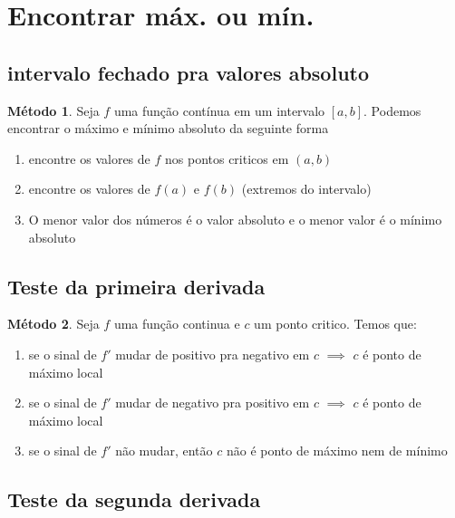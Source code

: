 \documentclass[14pt]{extreport}
\theoremstyle{definition}
\newtheorem{method}{Método}
\begin{document}
\section{Encontrar máx. ou mín.}

\subsection{intervalo fechado pra valores absoluto}

\begin{method}
    Seja \(f\) uma função contínua em um intervalo \([a,b]\).
    Podemos encontrar o máximo e mínimo absoluto da seguinte forma
    
    \begin{enumerate}
        \item encontre os valores de \(f\) nos pontos criticos em \((a,b)\)
        \item encontre os valores de \(f(a)\) e \(f(b)\) (extremos do intervalo)
        \item O menor valor dos números é o valor absoluto e o menor valor é o mínimo absoluto
        
    \end{enumerate}    
\end{method}



\subsection{Teste da primeira derivada}
\begin{method}
    Seja \(f\) uma função continua e \(c\) um ponto critico. Temos que:
    \begin{enumerate}
        \item se o sinal de \(f'\) mudar de positivo pra negativo em \(c\) \(\implies\) \(c\) é ponto de máximo local
        \item se o sinal de \(f'\) mudar de negativo pra positivo em \(c\) \(\implies\) \(c\) é ponto de máximo local
        \item se o sinal de \(f'\) não mudar, então \(c\) não é ponto de máximo nem de mínimo
    \end{enumerate}    
\end{method}



\subsection{Teste da segunda derivada}
\end{document}
